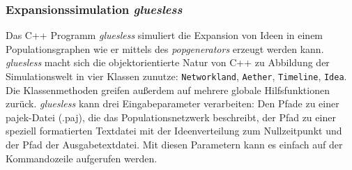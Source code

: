 \documentclass[openany,twoside,twocolumn]{book}
\begin{document}
\hypertarget{gluesless}{%
\subsubsection{\texorpdfstring{Expansionssimulation
\emph{gluesless}}{Expansionssimulation gluesless}}\label{gluesless}}

Das C++ Programm \emph{gluesless} simuliert die Expansion von Ideen in
einem Populationsgraphen wie er mittels des \emph{popgenerators} erzeugt
werden kann. \emph{gluesless} macht sich die objektorientierte Natur von
C++ zu Abbildung der Simulationswelt in vier Klassen zunutze:
\texttt{Networkland}, \texttt{Aether}, \texttt{Timeline}, \texttt{Idea}.
Die Klassenmethoden greifen außerdem auf mehrere globale Hilfsfunktionen
zurück. \emph{gluesless} kann drei Eingabeparameter verarbeiten: Den
Pfade zu einer pajek-Datei (.paj), die das Populationsnetzwerk
beschreibt, der Pfad zu einer speziell formatierten Textdatei mit der
Ideenverteilung zum Nullzeitpunkt und der Pfad der Ausgabetextdatei. Mit
diesen Parametern kann es einfach auf der Kommandozeile aufgerufen
werden.
\end{document}
